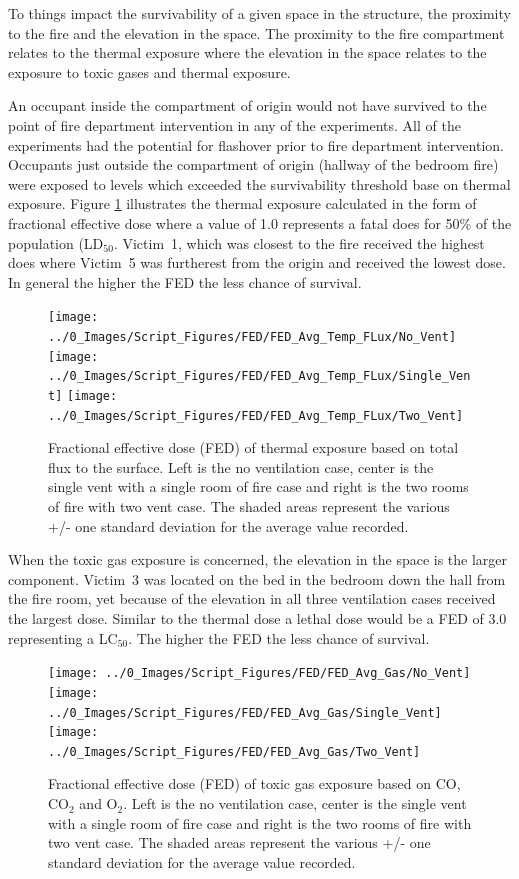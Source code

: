 \documentclass[12pt,oneside]{book}
\begin{document}
To things impact the survivability of a given space in the structure, the proximity to the fire and the elevation in the space. The proximity to the fire compartment relates to the thermal exposure where the elevation in the space relates to the exposure to toxic gases and thermal exposure. 

An occupant inside the compartment of origin would not have survived to the point of fire department intervention in any of the experiments. All of the experiments had the potential for flashover prior to fire department intervention. Occupants just outside the compartment of origin (hallway of the bedroom fire) were exposed to levels which exceeded the survivability threshold base on thermal exposure. Figure \ref{fig:FED_heat_TC} illustrates the thermal exposure calculated in the form of fractional effective dose where a value of 1.0 represents a fatal does for 50\% of the population (LD$_{50}$. Victim~1, which was closest to the fire received the highest does where Victim~5 was furtherest from the origin and received the lowest dose. In general the higher the FED the less chance of survival. 

\begin{figure}[H]
\centering
\texttt{[image: ../0\_Images/Script\_Figures/FED/FED\_Avg\_Temp\_FLux/No\_Vent]}
\texttt{[image: ../0\_Images/Script\_Figures/FED/FED\_Avg\_Temp\_FLux/Single\_Vent]}
\texttt{[image: ../0\_Images/Script\_Figures/FED/FED\_Avg\_Temp\_FLux/Two\_Vent]}
\caption[Thermal Exposure Total Flux - Three Ventilation Configurations]{Fractional effective dose (FED) of thermal exposure based on total flux to the surface. Left is the no ventilation case, center is the single vent with a single room of fire case and right is the two rooms of fire with two vent case. The shaded areas represent the various +/- one standard deviation for the average value recorded.}
\label{fig:FED_heat_TC}
\end{figure}

When the toxic gas exposure is concerned, the elevation in the space is the larger component. Victim~3 was located on the bed in the bedroom down the hall from the fire room, yet because of the elevation in all three ventilation cases received the largest dose. Similar to the thermal dose a lethal dose would be a FED of 3.0 representing a LC$_{50}$. The higher the FED the less chance of survival. 

\begin{figure}[H]
\centering
\texttt{[image: ../0\_Images/Script\_Figures/FED/FED\_Avg\_Gas/No\_Vent]}
\texttt{[image: ../0\_Images/Script\_Figures/FED/FED\_Avg\_Gas/Single\_Vent]}
\texttt{[image: ../0\_Images/Script\_Figures/FED/FED\_Avg\_Gas/Two\_Vent]}
\caption[Toxic Gas Exposure - Three Ventilation Configurations]{Fractional effective dose (FED) of toxic gas exposure based on CO, CO$_2$ and O$_2$. Left is the no ventilation case, center is the single vent with a single room of fire case and right is the two rooms of fire with two vent case. The shaded areas represent the various +/- one standard deviation for the average value recorded.}
\label{fig:FED_gas_TC}
\end{figure}
\end{document}
